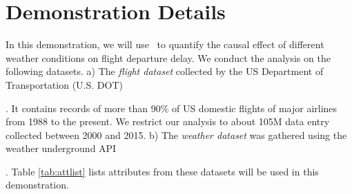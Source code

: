 \section{Demonstration Details}
\label{sec:dd}
 In this demonstration, we will use \GSQL\ to quantify the causal effect of
 different weather conditions on flight departure delay. We conduct the analysis on the following datasets. a)  The {\em flight dataset} collected by the US
Department of Transportation (U.S. DOT) . It contains
records of more than 90\% of US domestic flights of major airlines
from 1988 to the present. We restrict our analysis to about 105M data entry
collected between 2000 and 2015. b) The {\em weather dataset} was gathered using the weather underground API .  Table \ref{tab:attlist} lists attributes from these datasets  will be used in this demonstration.




